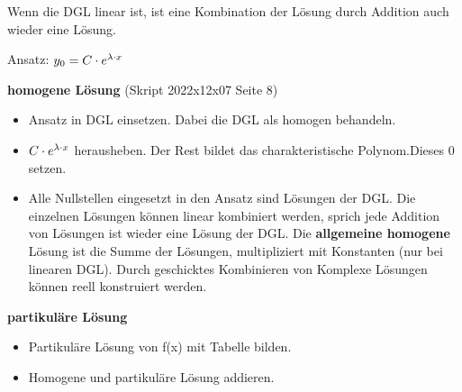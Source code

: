 
Wenn die DGL linear ist, ist eine Kombination der Lösung durch Addition auch wieder eine Lösung.

Ansatz: $y_0=C\cdot e^{\lambda \cdot x}$

\textbf{homogene Lösung} (Skript 2022x12x07 Seite 8)
\begin{itemize}
    \item Ansatz in DGL einsetzen. Dabei die DGL als homogen behandeln.
    \item $C\cdot e^{\lambda \cdot x}$ herausheben. Der Rest bildet das charakteristische Polynom.Dieses 0 setzen.
    \item Alle Nullstellen eingesetzt in den Ansatz sind Lösungen der DGL. Die einzelnen Lösungen können linear kombiniert werden, sprich jede Addition von Lösungen ist wieder eine Lösung der DGL. Die \textbf{allgemeine homogene} Lösung ist die Summe der Lösungen, multipliziert mit Konstanten (nur bei linearen DGL). Durch geschicktes Kombinieren von Komplexe Lösungen können reell konstruiert werden.
\end{itemize}

\textbf{partikuläre Lösung}
\begin{itemize}
    \item Partikuläre Lösung von f(x) mit Tabelle bilden.
    \item Homogene und partikuläre Lösung addieren.    
\end{itemize}



